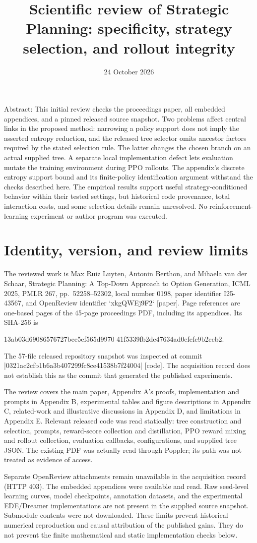 \documentclass[10pt]{article}
\title{Scientific review of Strategic Planning:
specificity, strategy selection, and rollout integrity}
\author{}
\date{24 October 2026}
\begin{document}
\maketitle
Abstract: This initial review checks the proceedings paper, all embedded appendices, and a pinned released source snapshot. Two problems affect central links in the proposed method: narrowing a policy support does not imply the asserted entropy reduction, and the released tree selector omits ancestor factors required by the stated selection rule. The latter changes the chosen branch on an actual supplied tree. A separate local implementation defect lets evaluation mutate the training environment during PPO rollouts. The appendix’s discrete entropy support bound and its finite-policy identification argument withstand the checks described here. The empirical results support useful strategy-conditioned behavior within their tested settings, but historical code provenance, total interaction costs, and some selection details remain unresolved. No reinforcement-learning experiment or author program was executed.\par
\section*{Identity, version, and review limits}
The reviewed work is Max Ruiz Luyten, Antonin Berthon, and Mihaela van der Schaar, Strategic Planning: A Top-Down Approach to Option Generation, ICML 2025, PMLR 267, pp. 52258–52302, local number 0198, paper identifier I25-43567, and OpenReview identifier `xkgQWEj9F2` [paper]. Page references are one-based pages of the 45-page proceedings PDF, including its appendices. Its SHA-256 is\par
13ab03d69086576727bee5ef565d9970
41f5339fb2de47634ad0efefc9b2ccb2.\par
The 57-file released repository snapshot was inspected at commit |0321ac2cfb1b6a3b407299fc8ce41538b7f24004| [code]. The acquisition record does not establish this as the commit that generated the published experiments.\par
The review covers the main paper, Appendix A’s proofs, implementation and prompts in Appendix B, experimental tables and figure descriptions in Appendix C, related-work and illustrative discussions in Appendix D, and limitations in Appendix E. Relevant released code was read statically: tree construction and selection, prompts, reward-score collection and distillation, PPO reward mixing and rollout collection, evaluation callbacks, configurations, and supplied tree JSON. The existing PDF was actually read through Poppler; its path was not treated as evidence of access.\par
Separate OpenReview attachments remain unavailable in the acquisition record (HTTP 403). The embedded appendices were available and read. Raw seed-level learning curves, model checkpoints, annotation datasets, and the experimental EDE/Dreamer implementations are not present in the supplied source snapshot. Submodule contents were not downloaded. These limits prevent historical numerical reproduction and causal attribution of the published gains. They do not prevent the finite mathematical and static implementation checks below.\par
\end{document}
